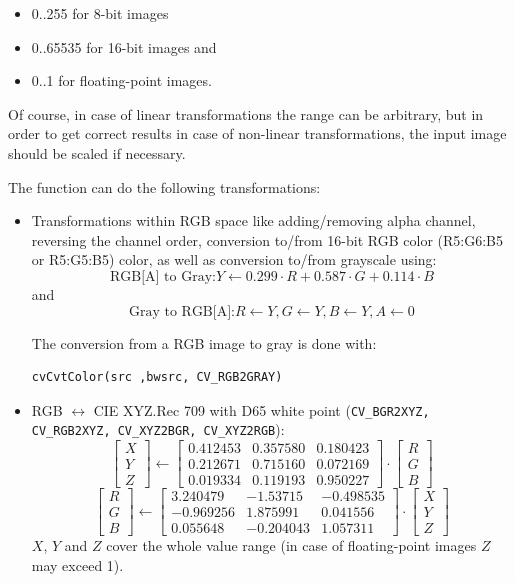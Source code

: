 \begin{itemize}
 \item 0..255 for 8-bit images
 \item 0..65535 for 16-bit images and
 \item 0..1 for floating-point images.
\end{itemize}

Of course, in case of linear transformations the range can be
arbitrary, but in order to get correct results in case of non-linear
transformations, the input image should be scaled if necessary.

The function can do the following transformations:

\begin{itemize}
 \item Transformations within RGB space like adding/removing alpha channel, reversing the channel order, conversion to/from 16-bit RGB color (R5:G6:B5 or R5:G5:B5) color, as well as conversion to/from grayscale using:
 \[
 \text{RGB[A] to Gray:} Y \leftarrow 0.299 \cdot R + 0.587 \cdot G + 0.114 \cdot B
 \]
 and
 \[
 \text{Gray to RGB[A]:} R \leftarrow Y, G \leftarrow Y, B \leftarrow Y, A \leftarrow 0
 \]

The conversion from a RGB image to gray is done with:
\begin{lstlisting}
cvCvtColor(src ,bwsrc, CV_RGB2GRAY)
\end{lstlisting}

 \item RGB $\leftrightarrow$ CIE XYZ.Rec 709 with D65 white point (\texttt{CV\_BGR2XYZ, CV\_RGB2XYZ, CV\_XYZ2BGR, CV\_XYZ2RGB}):
 \[
 \begin{bmatrix}
 X \\
 Y \\
 Z
 \end{bmatrix}
 \leftarrow
 \begin{bmatrix}
0.412453 & 0.357580 & 0.180423\\
0.212671 & 0.715160 & 0.072169\\
0.019334 & 0.119193 & 0.950227
 \end{bmatrix}
 \cdot
 \begin{bmatrix}
 R \\
 G \\
 B
 \end{bmatrix}
 \]
 \[
 \begin{bmatrix}
 R \\
 G \\
 B
 \end{bmatrix}
 \leftarrow
 \begin{bmatrix}
3.240479 & -1.53715 & -0.498535\\
-0.969256 &  1.875991 & 0.041556\\
0.055648 & -0.204043 & 1.057311
 \end{bmatrix}
 \cdot
 \begin{bmatrix}
 X \\
 Y \\
 Z
 \end{bmatrix}
 \]
$X$, $Y$ and $Z$ cover the whole value range (in case of floating-point images $Z$ may exceed 1).


\end{itemize}
